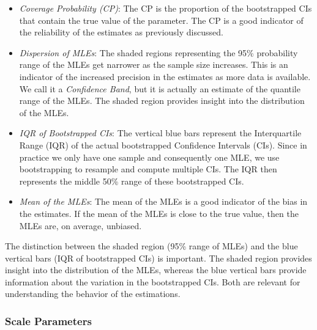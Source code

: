 \documentclass[
]{article}
\begin{document}
\begin{itemize}
\item
  \emph{Coverage Probability (CP)}: The CP is the proportion of the
  bootstrapped CIs that contain the true value of the parameter. The CP
  is a good indicator of the reliability of the estimates as previously
  discussed.
\item
  \emph{Dispersion of MLEs}: The shaded regions representing the 95\%
  probability range of the MLEs get narrower as the sample size
  increases. This is an indicator of the increased precision in the
  estimates as more data is available. We call it a \emph{Confidence
  Band}, but it is actually an estimate of the quantile range of the
  MLEs. The shaded region provides insight into the distribution of the
  MLEs.
\item
  \emph{IQR of Bootstrapped CIs}: The vertical blue bars represent the
  Interquartile Range (IQR) of the actual bootstrapped Confidence
  Intervals (CIs). Since in practice we only have one sample and
  consequently one MLE, we use bootstrapping to resample and compute
  multiple CIs. The IQR then represents the middle 50\% range of these
  bootstrapped CIs.
\item
  \emph{Mean of the MLEs}: The mean of the MLEs is a good indicator of
  the bias in the estimates. If the mean of the MLEs is close to the
  true value, then the MLEs are, on average, unbiased.
\end{itemize}

The distinction between the shaded region (95\% range of MLEs) and the
blue vertical bars (IQR of bootstrapped CIs) is important. The shaded
region provides insight into the distribution of the MLEs, whereas the
blue vertical bars provide information about the variation in the
bootstrapped CIs. Both are relevant for understanding the behavior of
the estimations.

\hypertarget{scale-parameters}{%
\subsubsection*{Scale Parameters}\label{scale-parameters}}
\end{document}
